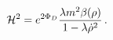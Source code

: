 \begin{equation}
\label{hamil} {\cal H}^2 = e^{2 \Phi_D} \frac{\lambda m^2
\beta(\rho)}{1- \lambda \dot{\rho}^2}\,.
\end{equation}

